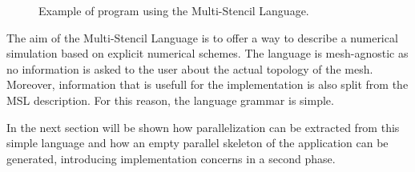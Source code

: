\begin{figure}[!h]
  \hspace{5mm}
  \begin{minipage}[!h]{0.98\textwidth}
    {}   
    \caption{Example of program using the Multi-Stencil Language. \label{fig:exmsl}}
  \end{minipage}
\end{figure}

The aim of the Multi-Stencil Language is to offer a way to describe a numerical simulation based on explicit numerical schemes. The language is mesh-agnostic as no information is asked to the user about the actual topology of the mesh. Moreover, information that is usefull for the implementation is also split from the MSL description. For this reason, the language grammar is simple. 

In the next section will be shown how parallelization can be extracted from this simple language and how an empty parallel skeleton of the application can be generated, introducing implementation concerns in a second phase.